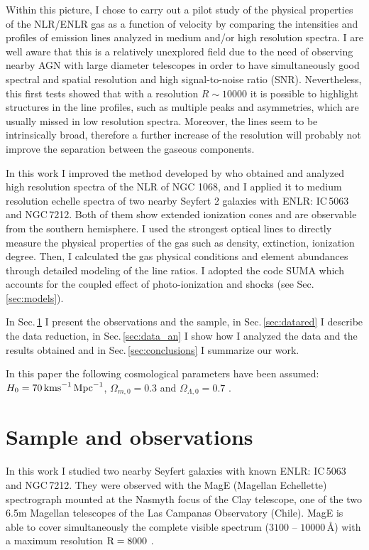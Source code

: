 \documentclass[../main.tex]{subfiles}
\begin{document}
Within this picture, I chose to carry out a pilot study of the physical properties of the NLR/ENLR gas as a function of velocity by comparing the intensities and profiles of emission lines analyzed in medium and/or high resolution spectra.
I are well aware that this is a relatively unexplored field due to the need of observing nearby AGN with large diameter telescopes in order to have simultaneously good spectral and spatial resolution and high signal-to-noise ratio (SNR).
Nevertheless, this first tests showed that with a resolution $R \sim  10000$ it is possible to highlight structures in the line profiles, such as multiple peaks and asymmetries, which are usually missed in low resolution spectra. 
Moreover, the lines seem to be intrinsically broad, therefore a further increase of the resolution will probably not improve the separation between the gaseous components.

In this work I improved the method developed by \citet{Ozaki09} who obtained and analyzed high resolution spectra of the NLR of NGC 1068, and I applied it to medium resolution echelle spectra of two nearby Seyfert 2 galaxies with ENLR: IC\,5063 and NGC\,7212.
Both of them show extended ionization cones and are observable from the southern hemisphere.
I used the strongest optical lines to directly measure the physical properties of the gas such as density, extinction, ionization degree. 
Then, I calculated the gas physical conditions and element abundances through detailed modeling of the line ratios. 
I adopted the code SUMA \citep{Contini12} which accounts for the coupled effect of photo-ionization and shocks (see Sec.\,\ref{sec:models}).

In Sec.\,\ref{sec:sample} I present the observations and the sample, in Sec.\,\ref{sec:datared} I describe the data reduction, in Sec.\,\ref{sec:data_an} I show how I analyzed the data and the results obtained and in Sec.\,\ref{sec:conclusions} I summarize our work.

In this paper the following cosmological parameters have been assumed:  $H_0 = 70\,\si{\kms\,Mpc^{-1}}$, $\Omega_{m,0}=0.3$ and $\Omega_{\Lambda,0}=0.7$ \citep{Komatsu11}.





\section{Sample and observations}
\label{sec:sample}

In this work I studied two nearby Seyfert galaxies with known ENLR: IC\,5063 and NGC\,7212.
They were observed with the MagE (Magellan Echellette) spectrograph mounted at the Nasmyth focus of the Clay telescope, one of the two 6.5m Magellan telescopes of the Las Campanas Observatory (Chile).
MagE is able to cover simultaneously the complete visible spectrum ($3100$ -- $10000\,\si{\angstrom}$) with a maximum resolution $\rm R=8000$ \citep{Marshall08}.
\end{document}
